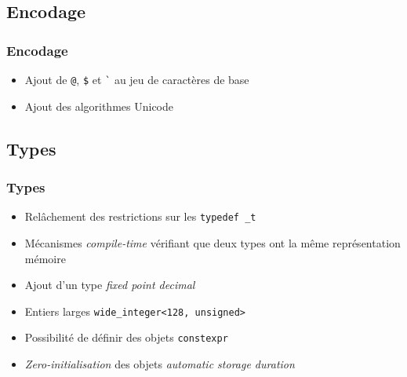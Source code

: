 \documentclass[C++.tex]{subfiles}
\begin{document}
\subsection*{Encodage}
\begin{frame}[fragile]
	\frametitle{Encodage}
	\begin{itemize}
		\item Ajout de \lstinline|@|, \lstinline|$| et \lstinline|`| au jeu de caractères de base


		\item Ajout des algorithmes Unicode

	\end{itemize}
\end{frame}

\subsection*{Types}
\begin{frame}[fragile]
	\frametitle{Types}
	\begin{itemize}
		\item Relâchement des restrictions sur les \lstinline|typedef _t|
		\item Mécanismes \textit{compile-time} vérifiant que deux types ont la même représentation mémoire


		\item Ajout d'un type \og{}\textit{fixed point decimal}\fg{}
		\item Entiers larges \lstinline|wide_integer<128, unsigned>|
		\item Possibilité de définir des objets \lstinline|constexpr|
		\item \textit{Zero-initialisation} des objets \textit{automatic storage duration}

	\end{itemize}
\end{frame}
\end{document}
